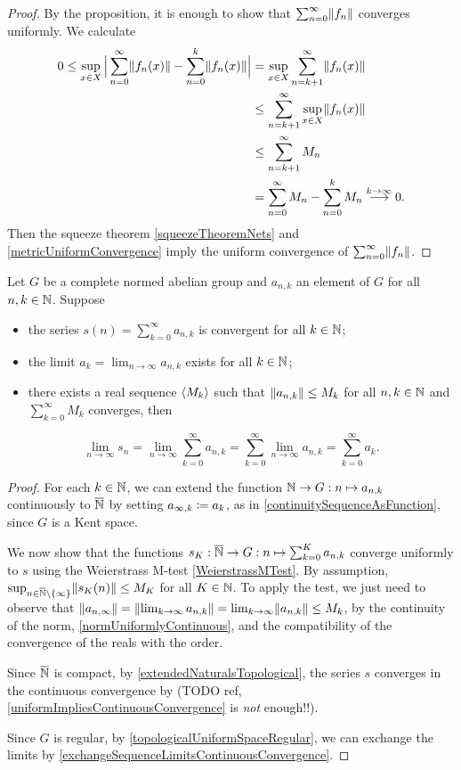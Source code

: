 \begin{proof}
By the proposition, it is enough to show that $\sum_{n=0}^\infty \lVert f_n\rVert$ converges uniformly. We calculate
\begin{align*}
0\leq \sup_{x\in X}\Big|\sum_{n=0}^\infty \lVert f_n(x)\rVert - \sum_{n=0}^k \lVert f_n(x)\rVert\Big| &= \sup_{x\in X}\sum_{n=k+1}^\infty \lVert f_n(x)\rVert \\
&\leq \sum_{n=k+1}^\infty \sup_{x\in X}\lVert f_n(x)\rVert \\
&\leq \sum_{n=k+1}^\infty M_n \\
&= \sum_{n=0}^\infty M_n - \sum_{n=0}^k M_n \overset{k\to \infty}{\longrightarrow} 0. 
\end{align*}
Then the squeeze theorem \ref{squeezeTheoremNets} and \ref{metricUniformConvergence} imply the uniform convergence of $\sum_{n=0}^\infty \lVert f_n\rVert$.
\end{proof}
\begin{corollary} \label{tannery}
Let $G$ be a complete normed abelian group and $a_{n,k}$ an element of $G$ for all $n,k\in \mathbb{N}$. Suppose
\begin{itemize}
\item the series $s(n) = \sum_{k=0}^\infty a_{n,k}$ is convergent for all $k\in \mathbb{N}$;
\item the limit $a_k = \lim_{n\to\infty}a_{n,k}$ exists for all $k\in \mathbb{N}$;
\item there exists a real sequence $\left\langle M_k \right\rangle$ such that $\lVert a_{n,k}\rVert \leq M_k$ for all $n,k\in \mathbb{N}$ and $\sum_{k=0}^\infty M_k$ converges, then
\end{itemize}
\[ \lim_{n\to\infty} s_n = \lim_{n\to\infty}\sum_{k=0}^\infty a_{n,k} = \sum_{k=0}^\infty\lim_{n\to\infty} a_{n,k} = \sum_{k=0}^\infty a_k.   \]
\end{corollary}
\begin{proof}
For each $k \in \mathbb{N}$, we can extend the function $\mathbb{N}\to G: n\mapsto a_{n,k}$ continuously to $\overline{\mathbb{N}}$ by setting $a_{\infty, k}  \coloneqq a_k$, as in \ref{continuitySequenceAsFunction}, since $G$ is a Kent space.

We now show that the functions $s_K: \overline{\mathbb{N}} \to G: n\mapsto \sum_{k=0}^K a_{n,k}$ converge uniformly to $s$ using the Weierstrass M-test \ref{WeierstrassMTest}. By assumption, $\sup_{n\in \overline{\mathbb{N}}\setminus\{\infty\}}\lVert s_K(n)\rVert \leq M_K$ for all $K\in \mathbb{N}$. To apply the test, we just need to observe that $\lVert a_{n,\infty}\rVert = \lVert\lim_{k\to \infty}a_{n,k}\rVert = \lim_{k\to \infty}\lVert a_{n,k}\rVert \leq M_k$, by the continuity of the norm, \ref{normUniformlyContinuous}, and the compatibility of the convergence of the reals with the order.

Since $\overline{\mathbb{N}}$ is compact, by \ref{extendedNaturalsTopological}, the series $s$ converges in the continuous convergence by (TODO ref, \ref{uniformImpliesContinuousConvergence} is \emph{not} enough!!).

Since $G$ is regular, by \ref{topologicalUniformSpaceRegular}, we can exchange the limits by \ref{exchangeSequenceLimitsContinuousConvergence}.
\end{proof}
